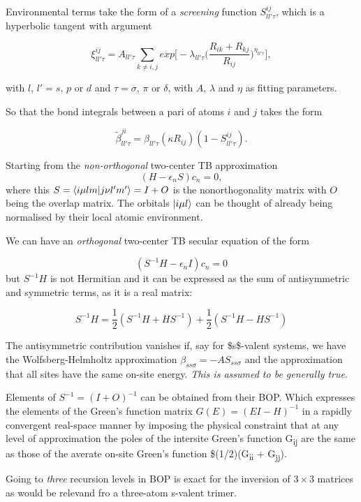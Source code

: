 \documentclass[11pt]{article}
\begin{document}
\begin{enumerate}
Environmental terms take the form of a \emph{screening} function \(S^{ij}_{ll'\tau}\),
which is a hyperbolic tangent with argument 

\begin{equation}
\xi^{ij}_{ll'\tau} = A_{ll'\tau} \sum_{k \neq i,j} exp \Big[
    - \lambda_{ll'\tau} \Big( 
              \frac{R_{ik} + R_{kj}}{R_{ij}} \Big)^{\eta_{ll'\tau}} \Big],
\end{equation}

with \(l\), \(l' = s\), \(p\) or \(d\) and \(\tau = \sigma\), \(\pi\) or \(\delta\), with
\(A\), \(\lambda\) and \(\eta\) as fitting parameters. 

So that the bond integrals between a pari of atoms \(i\) and \(j\) takes the form 

\[
\widetilde{\beta}^{ji}_{ll'\tau} = \beta_{ll'\tau}(\kappa R_{ij}) ( 1 - S^{ij}_{ll'\tau}).
\]

Starting from the \emph{non-orthogonal} two-center TB approximation 
\[
( H - \epsilon_{n} S  )c_{n} = 0,
\]
where this \(S = \bra{i\mu lm}\ket{j\nu l'm'} = I + O\) is the nonorthogonality matrix with \(O\) being the
overlap matrix. The orbitals \(\ket{i\mu l}\) can be thought of already being
normalised by their local atomic environment. 

We can have an \emph{orthogonal} two-center TB secular equation of the form 

\[
(S^{-1}H - \epsilon_{n}I)c_{n} = 0
\]
but \(S^{-1}H\) is not Hermitian and it can be expressed as the sum of
antisymmetric and symmetric terms, as it is a real matrix:

\[
S^{-1}H = \frac{1}{2} ( S^{-1}H + HS^{-1}) + \frac{1}{2}( S^{-1}H - HS^{-1})
\]

The antisymmetric contribution vanishes if, say for \$s\$-valent systems, we have the
Wolfsberg-Helmholtz approximation \(\beta_{ss\sigma} = -AS_{ss\sigma}\) and the
approximation that all sites have the same on-site energy. 
\emph{This is assumed to be generally true}.


Elements of \(S^{-1} =  (I + O)^{-1}\) can be obtained from their BOP. Which
expresses the elements of the Green's function matrix \(G(E) = (EI - H)^{-1}\)
in a rapidly convergent real-space manner by imposing the physical constraint
that at any level of approximation the poles of the intersite Green's function
G\textsubscript{ij} are the same as those of the averate on-site Green's function
\$(1/2)(G\textsubscript{ii} + G\textsubscript{jj}). 


Going to \emph{three} recursion levels in BOP is exact for the inversion of
\(3\times 3\) matrices as would be relevand fro a three-atom s-valent trimer. 


\end{enumerate}
\end{document}
